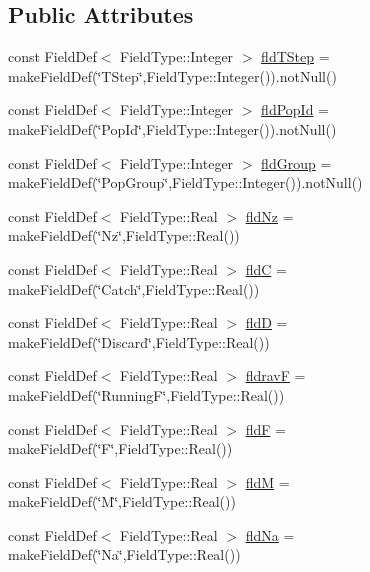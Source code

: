\subsection*{Public Attributes}
\begin{DoxyCompactItemize}
\item 
const Field\+Def$<$ Field\+Type\+::\+Integer $>$ \mbox{\hyperlink{class_pop_dyn_table_a552686556395ac42a807469d61122283}{fld\+T\+Step}} = make\+Field\+Def(\char`\"{}T\+Step\char`\"{},Field\+Type\+::\+Integer()).not\+Null()
\item 
const Field\+Def$<$ Field\+Type\+::\+Integer $>$ \mbox{\hyperlink{class_pop_dyn_table_ad51d99b3177df980d855e64ec2b41929}{fld\+Pop\+Id}} = make\+Field\+Def(\char`\"{}Pop\+Id\char`\"{},Field\+Type\+::\+Integer()).not\+Null()
\item 
const Field\+Def$<$ Field\+Type\+::\+Integer $>$ \mbox{\hyperlink{class_pop_dyn_table_a3e43d6c14cadec8feb0dcdec3b202939}{fld\+Group}} = make\+Field\+Def(\char`\"{}Pop\+Group\char`\"{},Field\+Type\+::\+Integer()).not\+Null()
\item 
const Field\+Def$<$ Field\+Type\+::\+Real $>$ \mbox{\hyperlink{class_pop_dyn_table_aab077b5a51bb261726bf9c76417169d4}{fld\+Nz}} = make\+Field\+Def(\char`\"{}Nz\char`\"{},Field\+Type\+::\+Real())
\item 
const Field\+Def$<$ Field\+Type\+::\+Real $>$ \mbox{\hyperlink{class_pop_dyn_table_a73d859709ce0ee0cab4040d6e985da13}{fldC}} = make\+Field\+Def(\char`\"{}Catch\char`\"{},Field\+Type\+::\+Real())
\item 
const Field\+Def$<$ Field\+Type\+::\+Real $>$ \mbox{\hyperlink{class_pop_dyn_table_acc39c279338d923ddf4a70c66dab64e3}{fldD}} = make\+Field\+Def(\char`\"{}Discard\char`\"{},Field\+Type\+::\+Real())
\item 
const Field\+Def$<$ Field\+Type\+::\+Real $>$ \mbox{\hyperlink{class_pop_dyn_table_a75abd6249f9a3d69609698e12cdf17f6}{fldravF}} = make\+Field\+Def(\char`\"{}RunningF\char`\"{},Field\+Type\+::\+Real())
\item 
const Field\+Def$<$ Field\+Type\+::\+Real $>$ \mbox{\hyperlink{class_pop_dyn_table_a50d22b3fd3483b1c237b5322f7dc11dc}{fldF}} = make\+Field\+Def(\char`\"{}F\char`\"{},Field\+Type\+::\+Real())
\item 
const Field\+Def$<$ Field\+Type\+::\+Real $>$ \mbox{\hyperlink{class_pop_dyn_table_a74145c3391e6498542d468bf063c3d01}{fldM}} = make\+Field\+Def(\char`\"{}M\char`\"{},Field\+Type\+::\+Real())
\item 
const Field\+Def$<$ Field\+Type\+::\+Real $>$ \mbox{\hyperlink{class_pop_dyn_table_ab25ca20a0efce5852a7163e55c3fbcf1}{fld\+Na}} = make\+Field\+Def(\char`\"{}Na\char`\"{},Field\+Type\+::\+Real())

\end{DoxyCompactItemize}
